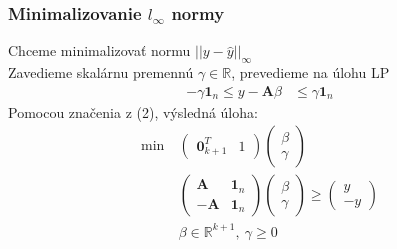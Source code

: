 \documentclass[presentation.tex]{subfiles}
\begin{document}
	\begin{frame}[shrink=0.5]
		\frametitle{Minimalizovanie  $l_{\infty}$ normy}
		\text Chceme minimalizovať normu $||y - \hat{y}||_{\infty}$ \\
		\text Zavedieme skalárnu premennú $\gamma \in \mathbb{R}$, prevedieme na úlohu LP 
		\begin{align*}
			-\gamma \mathbf{1}_n \leq y - \mathbf{A} \beta &\leq \gamma \mathbf{1}_n
		\end{align*}
		\text Pomocou značenia z (2), výsledná úloha:
		\begin{align*}
			\text{min}~ &
			\left(
			\begin{array}{c|c}
				\mathbf{0}_{k+1}^T & 1
			\end{array}
			\right)
			\left(
			\begin{array}{c}
				\beta \\
				\hline
				\gamma
			\end{array}
			\right) \\
			&\left(
			\begin{array}{c|c}
				\mathbf{A} & \mathbf{1}_n \\
				\hline
				-\mathbf{A} & \mathbf{1}_n
			\end{array}
			\right)
			\left(
			\begin{array}{c}
				\beta \\
				\hline
				\gamma
			\end{array}
			\right) 
			\geq
			\left(
			\begin{array}{c}
				y \\
				\hline
				-y
			\end{array}
			\right) \\
			&\beta \in \mathbb{R}^{k+1},~\gamma \geq 0 
		\end{align*}
	\end{frame}
\end{document}

